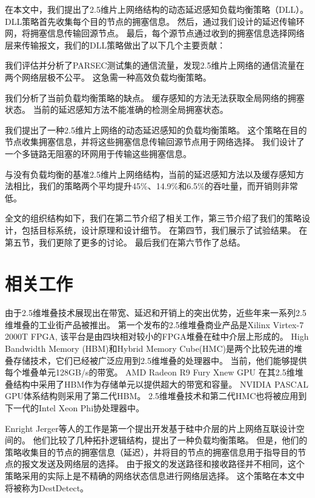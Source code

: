 在本文中，我们提出了2.5维片上网络结构的动态延迟感知负载均衡策略（DLL）。
DLL策略首先收集每个目的节点的拥塞信息。
然后，通过我们设计的延迟传输环网，将拥塞信息传输回源节点。
最后，每个源节点通过收到的拥塞信息选择网络层来传输报文，我们的DLL策略做出了以下几个主要贡献：

我们评估并分析了PARSEC测试集的通信流量，发现2.5维片上网络的通信流量在两个网络层极不公平。
这急需一种高效负载均衡策略。

我们分析了当前负载均衡策略的缺点。
缓存感知的方法无法获取全局网络的拥塞状态。
当前的延迟感知方法不能准确的检测全局拥塞状态。

我们提出了一种2.5维片上网络的动态延迟感知的负载均衡策略。
这个策略在目的节点收集拥塞信息，并将这些拥塞信息传输回源节点用于网络选择。
我们设计了一个多链路无阻塞的环网用于传输这些拥塞信息。

与没有负载均衡的基准2.5维片上网络结构，当前的延迟感知方法以及缓存感知方法相比，我们的策略两个平均提升45\%、14.9\%和6.5\%的吞吐量，而开销则非常低。

全文的组织结构如下，我们在第二节介绍了相关工作，第三节介绍了我们的策略设计，包括目标系统，设计原理和设计细节。
在第四节，我们展示了试验结果。
在第五节，我们更除了更多的讨论。
最后我们在第六节作了总结。



\section{相关工作}

由于2.5维堆叠技术展现出在带宽、延迟和开销上的突出优势，近些年来一系列2.5维堆叠的工业街产品被推出。
第一个发布的2.5维堆叠商业产品是Xilinx Virtex-7 2000T FPGA, 该平台是由四块相对较小的FPGA堆叠在硅中介层上形成的。
High Bandwidth Memory (HBM)和Hybrid Memory Cube(HMC)是两个比较先进的堆叠存储技术，它们已经被广泛应用到2.5维堆叠的处理器中。
当前，他们能够提供每个堆叠单元128GB/s的带宽。
AMD Radeon R9 Fury Xnew GPU 在其2.5维堆叠结构中采用了HBM作为存储单元以提供超大的带宽和容量。
NVIDIA PASCAL GPU体系结构则采用了第二代HBM。
2.5维堆叠技术和第二代HMC也将被应用到下一代的Intel Xeon Phi协处理器中。

Enright Jerger等人的工作是第一个提出开发基于硅中介层的片上网络互联设计空间的。
他们比较了几种拓扑逻辑结构，提出了一种负载均衡策略。
但是，他们的策略收集目的节点的拥塞信息（延迟），并将目的节点的拥塞信息用于指导目的节点的报文发送及网络层的选择。
由于报文的发送路径和接收路径并不相同，这个策略采用的实际上是不精确的网络状态信息进行网络层选择。
这个策略在本文中将被称为DestDetect。

